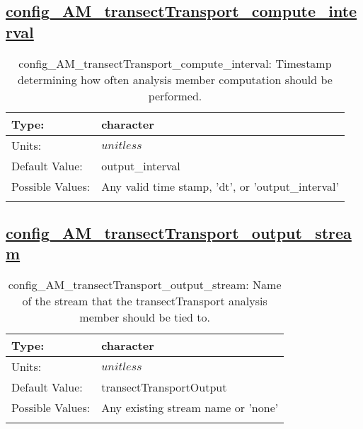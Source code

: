 \subsection[config\_AM\_transectTransport\_compute\_interval]{\hyperref[sec:nm_tab_AM_transectTransport]{config\_AM\_transectTransport\_compute\_interval}}
\label{subsec:nm_sec_config_AM_transectTransport_compute_interval}
\begin{center}
\begin{longtable}{| p{2.0in} || p{4.0in} |}
    \hline
    Type: & character \\
    \hline
    Units: & $unitless$ \\
    \hline
    Default Value: & output\_interval \\
    \hline
    Possible Values: & Any valid time stamp, 'dt', or 'output\_interval' \\
    \hline
    \caption{config\_AM\_transectTransport\_compute\_interval: Timestamp determining how often analysis member computation should be performed.}
\end{longtable}
\end{center}
\subsection[config\_AM\_transectTransport\_output\_stream]{\hyperref[sec:nm_tab_AM_transectTransport]{config\_AM\_transectTransport\_output\_stream}}
\label{subsec:nm_sec_config_AM_transectTransport_output_stream}
\begin{center}
\begin{longtable}{| p{2.0in} || p{4.0in} |}
    \hline
    Type: & character \\
    \hline
    Units: & $unitless$ \\
    \hline
    Default Value: & transectTransportOutput \\
    \hline
    Possible Values: & Any existing stream name or 'none' \\
    \hline
    \caption{config\_AM\_transectTransport\_output\_stream: Name of the stream that the transectTransport analysis member should be tied to.}
\end{longtable}
\end{center}
